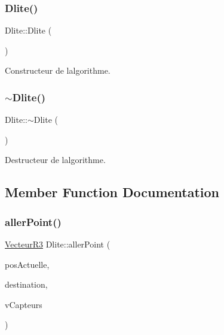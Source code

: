 \subsubsection{\texorpdfstring{Dlite()}{Dlite()}}
{\footnotesize\ttfamily Dlite\+::\+Dlite (\begin{DoxyParamCaption}{ }\end{DoxyParamCaption})}

Constructeur de l\textquotesingle{}algorithme. \mbox{\label{class_dlite_ab98746140c7aa4ded45a47459b4c47d5}} 
\subsubsection{\texorpdfstring{$\sim$\+Dlite()}{~Dlite()}}
{\footnotesize\ttfamily Dlite\+::$\sim$\+Dlite (\begin{DoxyParamCaption}{ }\end{DoxyParamCaption})\hspace{0.3cm}{\ttfamily [virtual]}}

Destructeur de l\textquotesingle{}algorithme. 

\subsection{Member Function Documentation}
\mbox{\label{class_dlite_a78c005fea65d3ae2429f74fd1d63c581}} 
\subsubsection{\texorpdfstring{aller\+Point()}{allerPoint()}}
{\footnotesize\ttfamily \mbox{\hyperlink{class_vecteur_r3}{Vecteur\+R3}} Dlite\+::aller\+Point (\begin{DoxyParamCaption}\item[{\mbox{\hyperlink{class_vecteur_r3}{Vecteur\+R3}}}]{pos\+Actuelle,  }\item[{\mbox{\hyperlink{class_vecteur_r3}{Vecteur\+R3}}}]{destination,  }\item[{std\+::vector$<$ \mbox{\hyperlink{class_capteur}{Capteur}} $>$}]{v\+Capteurs }\end{DoxyParamCaption})}

